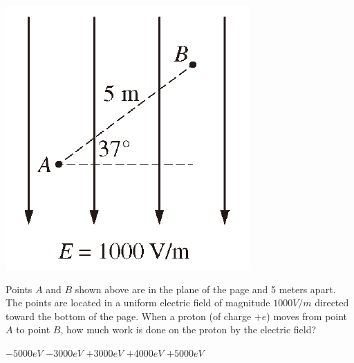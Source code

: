 
\begin{center}
    \includegraphics[scale=0.5]{images/3.png}
\end{center}

\begin{questions}
\setcounter{question}{2}

\question
Points $A$ and $B$ shown above are in the plane of the page and 5 meters apart. The points are located in a uniform electric field of magnitude $1000 \unit{V/m}$ directed toward the bottom of the page. When a proton (of charge $+e$) moves from point $A$ to point $B$, how much work is done on the proton by the electric field?

\begin{oneparchoices}
    \choice $-5000 \unit{eV}$
    \choice $-3000 \unit{eV}$
    \choice $+3000 \unit{eV}$
    \choice $+4000 \unit{eV}$
    \choice $+5000 \unit{eV}$
\end{oneparchoices}

\end{questions}
